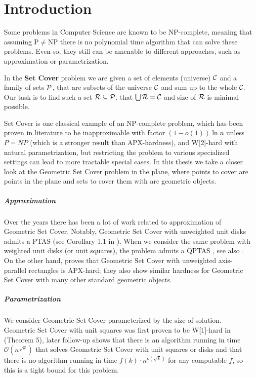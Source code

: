 \chapter{Introduction}

Some problems in Computer Science are known to be NP-complete,
meaning that assuming P$\neq$NP there is no polynomial time
algorithm that can solve these problems.
Even so, they still can be amenable to different approaches,
such as approximation or parametrization.

\begin{defi}
In the \textbf{Set Cover} problem we are given a set of elements (universe)
$\mathcal{C}$ and a family of sets $\mathcal{P}$, that are subsets of the universe $\mathcal{C}$
and sum up to the whole $\mathcal{C}$.
Our task is to find such a set $\mathcal{R} \subseteq \mathcal{P}$,
that $\bigcup \mathcal{R} = \mathcal{C}$ and size of $\mathcal{R}$ is minimal possible.
\end{defi}

Set Cover is one classical example of an NP-complete problem,
which has been proven
in literature to be
inapproximable with factor $(1-o(1))\ln n$ unless $P = NP$
(which is a stronger result than APX-hardness),
and W[2]-hard with natural parametrization,
but restricting the problem to various specialized settings
can lead to more tractable special cases.
In this thesis we take a closer look at the Geometric Set Cover problem
in the plane, where points to cover are points in the plane
and sets to cover them with are geometric objects.

\paragraph{Approximation}
Over the years there has been a lot of work related to approximation
of Geometric Set Cover. Notably,
Geometric Set Cover with unweighted unit disks admits a PTAS (see
Corollary 1.1 in \cite{unit_disks}). When we consider the same problem
with weighted unit disks (or unit squares), the problem admits a QPTAS
\cite{settling_apx_hardness}, see also \cite{voronoi_true}.
On the other hand, \cite{rectangles_apx_hard} 
proves that Geometric Set Cover with unweighted axis-parallel rectangles
is APX-hard; they also show similar hardness
for Geometric Set Cover with many other standard geometric objects.

\paragraph{Parametrization}
We consider Geometric Set Cover 
parameterized by the size of solution.
Geometric Set Cover with unit squares was first proven to be W[1]-hard 
in \cite{marx05} (Theorem 5), later follow-up \cite{voronoi}
shows that there is an algorithm running in time $\mathcal{O}(n^{\sqrt{k}})$
that solves Geometric Set Cover with unit squares or disks
and that there is no algorithm running in time $f(k) \cdot n^{o(\sqrt{k})}$
for any computable $f$, so this is a tight bound for this problem.

